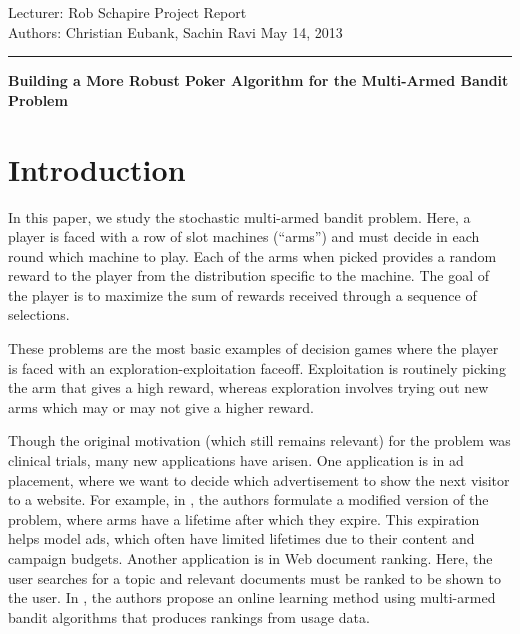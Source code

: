 \documentclass[12pt]{article}
\begin{document}
\thispagestyle{empty}


\noindent
Lecturer: Rob Schapire   %
\hfill
Project Report              %
\\
Authors: Christian Eubank, Sachin Ravi                %
\hfill
May 14, 2013           %

\noindent
\rule{\textwidth}{1pt}

\begin{center}
\bf\large Building a More Robust Poker Algorithm for the Multi-Armed Bandit Problem
\end{center}

\medskip

\section{Introduction}
In this paper, we study the stochastic multi-armed bandit problem. Here, a player is  
faced with a row of slot machines (``arms'') and must decide in each round which machine
to play.  Each of the arms when picked provides a random reward to the player from the distribution
specific to the machine. The goal of the player is to maximize the sum of rewards received through a
sequence of selections.  

These problems are the most basic examples of decision games where the player is faced with an 
exploration-exploitation faceoff.  Exploitation is routinely picking the arm that gives a high reward,
whereas exploration involves trying out new arms which may or may not give a higher reward. 

Though the original motivation (which still remains relevant) for the problem was clinical trials, many 
new applications have arisen.  One application is in ad placement, where we want to decide which advertisement
to show the next visitor to a website.  For example, in \cite{Chakrabarti}, the authors formulate a modified version
of the problem, where arms have a lifetime after which they expire.  This expiration helps model ads, which often 
have limited lifetimes due to their content and campaign budgets.  Another application is in Web document ranking.  
Here, the user searches for a topic and relevant documents must be ranked to be shown to the user.  In \cite{Radlinski}, 
the authors propose an online learning method using multi-armed bandit algorithms that produces rankings from usage data.   
\end{document}
